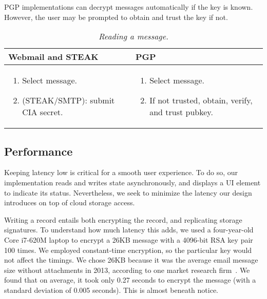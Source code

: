 PGP implementations can decrypt messages automatically if the key is known.  However, the user may be prompted to obtain and trust the key if not.

\begin{table}[ht!]
\begin{tabular}{ | L{3.5cm} | L{3.5cm} |}
\hline
\textbf{Webmail and STEAK} & \textbf{PGP} \\
\hline
\vspace{-3mm}
\begin{enumerate}
  \item{Select message.}
  \item{(STEAK/SMTP): submit CIA secret.}
\end{enumerate}
\vspace{-3mm}
 &

\vspace{-3mm}
\begin{enumerate}
  \item{Select message.}
  \item{If not trusted, obtain, verify, and trust pubkey.}
\end{enumerate} 
\vspace{-\topsep} \\

\hline
\end{tabular}
\caption{\it Reading a message.}
\label{tab:account-creation}
\end{table}

\subsection{Performance}

Keeping latency low is critical for a smooth user experience.  To do so, our implementation reads and writes state asynchronously, and displays a UI element to indicate its status.  Nevertheless, we seek to minimize the latency our design introduces on top of cloud storage access.

Writing a record entails both encrypting the record, and replicating storage signatures.  To understand how much latency this adds, we used a four-year-old Core i7-620M laptop to encrypt a 26KB message with a 4096-bit RSA key pair 100 times.  We employed constant-time encryption, so the particular key would not affect the timings.  We chose 26KB because it was the average email message size without attachments in 2013, according to one market research firm~\cite{email-statistics-report}.  We found that on average, it took only 0.27 seconds to encrypt the message (with a standard deviation of 0.005 seconds).  This is almost beneath notice.

